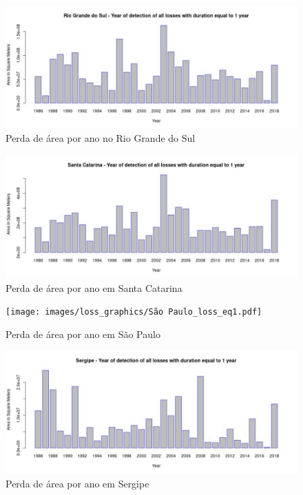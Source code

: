 \begin{figure}[H]
    \centering
    \includegraphics[scale=.5]{images/loss_graphics/Rio Grande do Sul_loss_eq1.pdf}
    \caption{Perda de área por ano no Rio Grande do Sul}
    \label{fig:loss_rio_grande_do_sul}
\end{figure}

\begin{figure}[H]
    \centering
    \includegraphics[scale=.5]{images/loss_graphics/Santa Catarina_loss_eq1.pdf}
    \caption{Perda de área por ano em Santa Catarina}
    \label{fig:loss_santa_catarina}
\end{figure}

\begin{figure}[H]
    \centering
    \texttt{[image: images/loss\_graphics/São Paulo\_loss\_eq1.pdf]}
    \caption{Perda de área por ano em São Paulo}
    \label{fig:loss_sao_paulo}
\end{figure}

\begin{figure}[H]
    \centering
    \includegraphics[scale=.5]{images/loss_graphics/Sergipe_loss_eq1.pdf}
    \caption{Perda de área por ano em Sergipe}
    \label{fig:loss_sergipe}
\end{figure}

